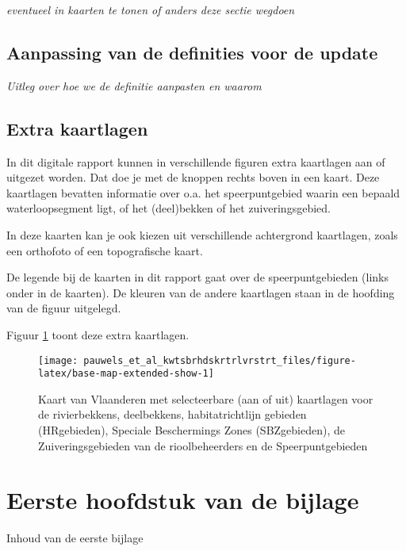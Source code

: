 \documentclass[twoside]{extreport}
\begin{document}
\emph{eventueel in kaarten te tonen of anders deze sectie wegdoen}

\section{Aanpassing van de definities voor de
update}\label{aanpassing-van-de-definities-voor-de-update}

\emph{Uitleg over hoe we de definitie aanpasten en waarom}

\section{Extra kaartlagen}\label{extra-kaartlagen}

In dit digitale rapport kunnen in verschillende figuren extra kaartlagen
aan of uitgezet worden. Dat doe je met de knoppen rechts boven in een
kaart. Deze kaartlagen bevatten informatie over o.a. het speerpuntgebied
waarin een bepaald waterloopsegment ligt, of het (deel)bekken of het
zuiveringsgebied.

In deze kaarten kan je ook kiezen uit verschillende achtergrond
kaartlagen, zoals een orthofoto of een topografische kaart.

De legende bij de kaarten in dit rapport gaat over de speerpuntgebieden
(links onder in de kaarten). De kleuren van de andere kaartlagen staan
in de hoofding van de figuur uitgelegd.

Figuur \ref{fig:base-map-extended-show} toont deze extra kaartlagen.

\begin{figure}

{\centering \texttt{[image: pauwels\_et\_al\_kwtsbrhdskrtrlvrstrt\_files/figure-latex/base-map-extended-show-1]} 

}

\caption{Kaart van Vlaanderen met selecteerbare (aan of uit) kaartlagen voor de rivierbekkens, deelbekkens, habitatrichtlijn gebieden (HRgebieden), Speciale Beschermings Zones (SBZgebieden), de Zuiveringsgebieden van de rioolbeheerders en de Speerpuntgebieden}\label{fig:base-map-extended-show}
\end{figure}

\appendix

\chapter{Eerste hoofdstuk van de
bijlage}\label{eerste-hoofdstuk-van-de-bijlage}

Inhoud van de eerste bijlage
\end{document}
